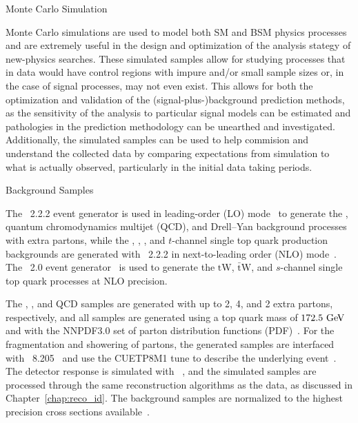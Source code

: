 \begin{section}{Monte Carlo Simulation}

Monte Carlo simulations are used to model both SM and BSM physics processes and are extremely useful in the design and optimization of the analysis stategy of new-physics searches.
These simulated samples allow for studying processes that in data would have control regions with impure and/or small sample sizes or, in the case of signal processes, may not even exist.
This allows for both the optimization and validation of the (signal-plus-)background prediction methods, as the sensitivity of the analysis to particular signal models can be estimated and pathologies in the prediction methodology can be unearthed and investigated.
Additionally, the simulated samples can be used to help commision and understand the collected data by comparing expectations from simulation to what is actually observed, particularly in the initial data taking periods.

\begin{subsection}{Background Samples}

The \MGatNLO~2.2.2 event generator is used in leading-order (LO) mode~\cite{Alwall:2014hca,Alwall:2007fs} to generate the
\ttbar, quantum chromodynamics multijet (QCD), \Wjets and Drell--Yan background processes with extra partons, while the \ttW, \ttZ, \tttt, and $t$-channel single top quark production backgrounds are generated with \MGatNLO~2.2.2 in next-to-leading order (NLO) mode~\cite{Frederix:2012ps}.
The \POWHEG~2.0 event generator~\cite{Nason:2004rx,Frixione:2007vw,Alioli:2010xd} is used to generate the $\mathrm{tW}$, $\mathrm{\bar{t}W}$, and $s$-channel single top quark processes at NLO precision.

The \ttbar, \Wjets, and QCD samples are generated with up to 2, 4, and 2 extra partons, respectively, and all samples are generated using a top quark mass of $172.5~\mathrm{Ge\kern -0.1em V}$ and with the NNPDF3.0 set of parton distribution functions (PDF)~\cite{Ball:2014uwa}.
For the fragmentation and showering of partons, the generated samples are interfaced with \PYTHIA~8.205~\cite{pythia8.2} and use the CUETP8M1 tune to describe the underlying event~\cite{Skands2014}.
The detector response is simulated with \GEANTfour~\cite{Agostinelli:2002hh}, and the simulated samples are processed through the same reconstruction algorithms as the data, as discussed in Chapter~\ref{chap:reco_id}.
The background samples are normalized to the highest precision cross sections available~\cite{PhysRevLett.110.252004,Gavin:2012sy,Alioli:2009je,Re:2010bp,Frixione:2015zaa,Bevilacqua:2012em,Nagy:2001fj}.


\end{subsection}
\end{section}
